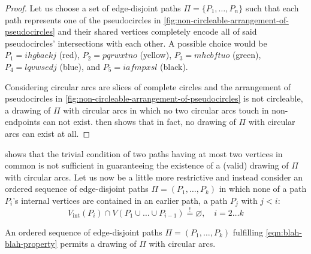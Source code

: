 \begin{proof}
\noindent
Let us choose a set of edge-disjoint paths ${\Pi = \lbrace P_1, \ldots, P_n \rbrace}$ such that each path represents one of the pseudocircles in \cref{fig:non-circleable-arrangement-of-pseudocircles} and their shared vertices completely encode all of said pseudocircles' intersections with each other. A possible choice would be ${P_1 = \mathit{ihgbaekj}}$ (red), ${P_2 = \mathit{pqrwxtno}}$ (yellow), ${P_3 = \mathit{mhcbftuo}}$ (green), ${P_4 = \mathit{lqvwsedj}}$ (blue), and ${P_5 = \mathit{iafmpxsl}}$ (black).

Considering circular arcs are slices of complete circles and the arrangement of pseudocircles in \cref{fig:non-circleable-arrangement-of-pseudocircles} is not circleable, a drawing of ${\Pi}$ with circular arcs in which no two circular arcs touch in non-endpoints can not exist.  then shows that in fact, no drawing of ${\Pi}$ with circular arcs can exist at all.
\end{proof}





\clearpage

\noindent
{} shows that the trivial condition of two paths having at most two vertices in common is not sufficient in guaranteeing the existence of a (valid) drawing of ${\Pi}$ with circular arcs. Let us now be a little more restrictive and instead consider an ordered sequence of edge-disjoint paths ${\Pi = (P_1, \ldots, P_k)}$ in which none of a path ${P_i}$'s internal vertices are contained in an earlier path, \ie{} a path ${P_j}$ with ${j < i}$:
%
\begin{equation}
  V_\text{int}(P_i) \cap V(P_1 \cup \ldots \cup P_{i-1}) \stackrel{!}{=} \varnothing,
  \quad i = 2 \ldots k
  \label{eqn:blah-blah-property}
\end{equation}





\hfill

\begin{theorem}
\label{thm:existence-of-drawing}
An ordered sequence of edge-disjoint paths ${\Pi = (P_1, \ldots, P_k)}$ fulfilling \cref{eqn:blah-blah-property} permits a drawing of ${\Pi}$ with circular arcs.
\end{theorem}

